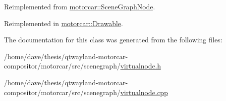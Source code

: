 Reimplemented from \hyperlink{classmotorcar_1_1SceneGraphNode_aa680a8e89fc8ebd12b784653fb30c29a}{motorcar\-::\-Scene\-Graph\-Node}.



Reimplemented in \hyperlink{classmotorcar_1_1Drawable_a931cb72d30d280d0e63f22c2e1ac39c6}{motorcar\-::\-Drawable}.



The documentation for this class was generated from the following files\-:\begin{DoxyCompactItemize}
\item 
/home/dave/thesis/qtwayland-\/motorcar-\/compositor/motorcar/src/scenegraph/\hyperlink{virtualnode_8h}{virtualnode.\-h}\item 
/home/dave/thesis/qtwayland-\/motorcar-\/compositor/motorcar/src/scenegraph/\hyperlink{virtualnode_8cpp}{virtualnode.\-cpp}\end{DoxyCompactItemize}
